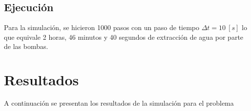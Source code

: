 \documentclass[10pt,a4paper,final]{article}
\begin{document}
\subsection{Ejecución}
Para la simulación, se hicieron 1000 pasos con un paso de tiempo $\Delta t=10~[s]$ lo que equivale 2 horas, 46 minutos y 40 segundos de extracción de agua por parte de las bombas.
\section{Resultados}
A continuación se presentan los resultados de la simulación para el problema
\end{document}
